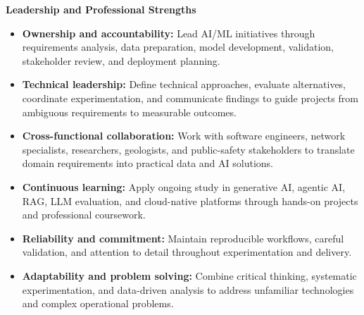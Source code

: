 \documentclass[9pt,letterpaper]{extarticle}
\begin{document}
\textbf{Leadership and Professional Strengths}\par
\begin{itemize}
\item \textbf{Ownership and accountability:} Lead AI/ML initiatives through requirements analysis, data preparation, model development, validation, stakeholder review, and deployment planning.
\item \textbf{Technical leadership:} Define technical approaches, evaluate alternatives, coordinate experimentation, and communicate findings to guide projects from ambiguous requirements to measurable outcomes.
\item \textbf{Cross-functional collaboration:} Work with software engineers, network specialists, researchers, geologists, and public-safety stakeholders to translate domain requirements into practical data and AI solutions.
\item \textbf{Continuous learning:} Apply ongoing study in generative AI, agentic AI, RAG, LLM evaluation, and cloud-native platforms through hands-on projects and professional coursework.
\item \textbf{Reliability and commitment:} Maintain reproducible workflows, careful validation, and attention to detail throughout experimentation and delivery.
\item \textbf{Adaptability and problem solving:} Combine critical thinking, systematic experimentation, and data-driven analysis to address unfamiliar technologies and complex operational problems.
\end{itemize}
\end{document}
